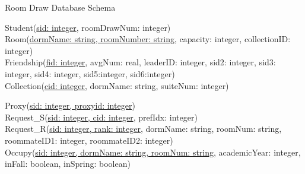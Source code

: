 \documentclass{article}
\begin{document}
\begin{center} \Large Room Draw Database Schema \end{center}

\noindent Student(\underline{sid: integer}, roomDrawNum: integer) \\

\noindent Room(\underline{dormName: string, roomNumber: string}, capacity: integer, collectionID: integer) \\

\noindent Friendship(\underline{fid: integer}, avgNum: real, leaderID: integer, sid2: integer, sid3: integer, sid4: integer, sid5:integer, sid6:integer) \\

\noindent Collection(\underline{cid: integer}, dormName: string, suiteNum: integer)

\noindent Proxy(\underline{sid: integer, proxyid: integer})\\

\noindent Request\_S(\underline{sid: integer, cid: integer}, prefIdx: integer) \\

\noindent Request\_R(\underline{sid: integer, rank: integer}, dormName: string, roomNum: string, roommateID1: integer, roommateID2: integer) \\

\noindent Occupy(\underline{sid: integer, dormName: string, roomNum: string}, academicYear: integer, inFall: boolean, inSpring: boolean) \\
\end{document}
